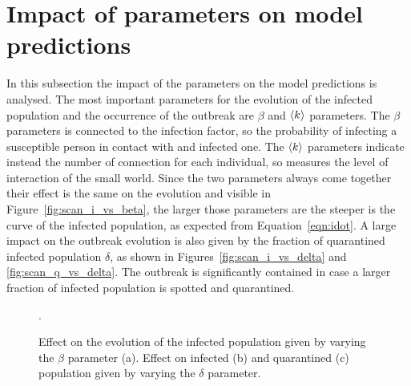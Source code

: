 \section{Impact of parameters on model predictions}
In this subsection the impact of the parameters on the model predictions is analysed. The most important parameters for the evolution of the infected population and the occurrence of the outbreak are $\beta$ and $\braket{k}$ parameters. The $\beta$ parameters is connected to the infection factor, so the probability of infecting a susceptible person in contact with and infected one. The $\braket{k}$ parameters indicate instead the number of connection for each individual, so measures the level of interaction of the small world. Since the two parameters always come together their effect is the same on the evolution and visible in Figure~\ref{fig:scan_i_vs_beta}, the larger those parameters are the steeper is the curve of the infected population, as expected from Equation~\ref{eqn:idot}.  A large impact on the outbreak evolution is also given by the fraction of quarantined infected population $\delta$, as shown in Figures~\ref{fig:scan_i_vs_delta} and \ref{fig:scan_q_vs_delta}. The outbreak is significantly contained in case a larger fraction of infected population is spotted and quarantined.

\begin{figure}[!ht]\centering
{}
\caption{Effect on the evolution of the infected population given by varying the $\beta$ parameter (a). Effect on infected (b) and quarantined (c) population given by varying the $\delta$ parameter.}.
\end{figure}


